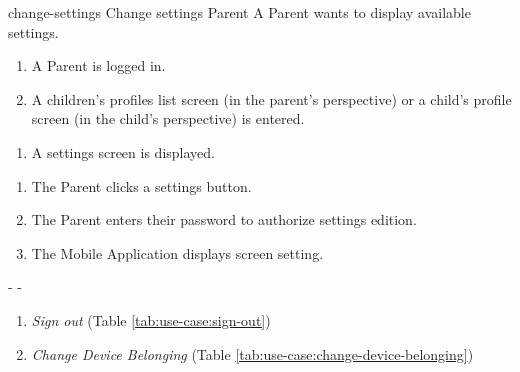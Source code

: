 {change-settings}
{Change settings}
{Parent}
{A Parent wants to display available settings.}
{\begin{enumerate} %
    \item A Parent is logged in.
    \item A children's profiles list screen (in the parent's perspective) or a child's profile screen (in the child's perspective) is entered.
\end{enumerate}}
{\begin{enumerate} %
   \item A settings screen is displayed.
\end{enumerate}}
{\begin{enumerate} %
   \item The Parent clicks a settings button.
   \item The Parent enters their password to authorize settings edition.
   \item The Mobile Application displays screen setting.
\end{enumerate}}
{-} %
{-} %
{\begin{enumerate} %
   \item \textit{Sign out} (Table \ref{tab:use-case:sign-out})
   \item \textit{Change Device Belonging} (Table \ref{tab:use-case:change-device-belonging})
\end{enumerate}}


